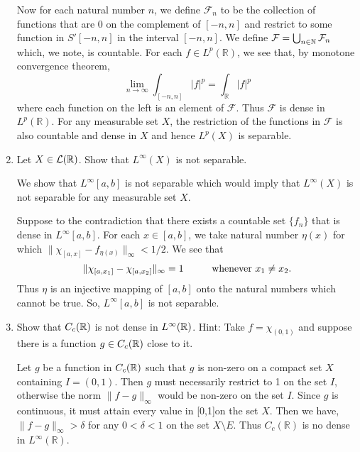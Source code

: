 \documentclass[12pt]{article}
\newcommand{\rl}{\mathbb{R}}
\begin{document}
\begin{enumerate}
\begin{mybox}
        \vspace*{2mm}
        Now for each natural number $n$, we define
        $\mathcal{F}_n$ to be the collection of functions that
        are 0 on the complement of $[-n,n]$ and restrict to
        some function in $S'[-n,n]$ in the interval
        $[-n,n]$. We define $\mathcal{F}=\bigcup_{n\in\mathbb{N}}
        {\mathcal{F}_n}$ which, we note, is countable. For
        each $f\in L^p(\rl)$, we see that, by monotone
        convergence theorem,
        $$\lim_{n\to\infty}\int_{[-n,n]}{|f|^p}=
        \int_{\rl}{|f|^p}$$
        where each function on the left is an element of
        $\mathcal{F}$. Thus $\mathcal{F}$ is dense in
        $L^p(\rl)$. For any measurable set $X$, the restriction
        of the functions in $\mathcal{F}$ is also countable
        and dense in $X$ and hence $L^p(X)$ is separable.
    \end{mybox}

    \item Let $X \in \mathcal{L}(\mathbb{R})$. Show that $L^{\infty}(X)$ is not separable. 
    \begin{mybox}
        We show that $L^\infty[a,b]$ is not separable
        which would imply that $L^\infty(X)$ is not
        separable for any measurable set $X$.

        \vspace*{2mm}
        Suppose to the contradiction that there exists
        a countable set $\{f_n\}$ that is dense in
        $L^\infty[a,b]$. For each $x\in[a,b]$, we take
        natural number
        $\eta(x)$ for which $\|\chi_{[a,x]}-f_{\eta(x)}
        \|_\infty<1/2.$ We see that
        $$\|\chi_{[a,x_1]}-\chi_{[a,x_2]}\|_\infty =1
        \hspace*{10mm}\text{whenever $x_1\neq x_2$}.$$
        Thus $\eta$ is an injective mapping of $[a,b]$
        onto the natural numbers which cannot be true.
        So, $L^\infty[a,b]$ is not separable.
    \end{mybox}
    
    \item Show that $C_c(\mathbb{R})$ is not dense in $L^{\infty}(\mathbb{R})$. Hint: Take $f = \chi_{(0,1)}$ and suppose there is a function $g \in  C_c(\mathbb{R})$ close to it.
    \begin{mybox}
        Let $g$ be a function in $C_c(\mathbb{R})$ such that $g$
        is non-zero on a compact set $X$ containing $I=(0,1)$.
        Then $g$ must necessarily restrict to 1 on the set
        $I$, otherwise the norm $\|f-g\|_\infty$ would be
        non-zero on the set $I$. Since $g$ is continuous,
        it must attain every value in [0,1]on the set $X$. Then we have,
        $\|f-g\|_\infty>\delta$ for any $0<\delta<1$
        on the set $X\setminus E$. Thus $C_c(\rl)$
        is no dense in $L^\infty(\rl)$.
    \end{mybox}
    

\end{enumerate}
\end{document}
